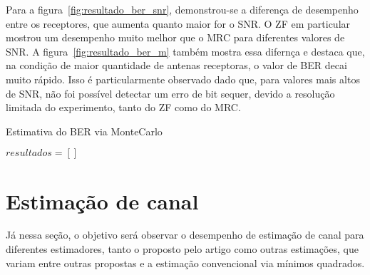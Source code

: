 \documentclass{article}
\begin{document}
Para a figura~\ref{fig:resultado_ber_snr}, demonstrou-se a diferença de desempenho entre os receptores, que aumenta quanto maior for o SNR. O ZF em particular mostrou um desempenho muito melhor que o MRC para diferentes valores de SNR. A figura~\ref{fig:resultado_ber_m} também mostra essa difernça e destaca que, na condição de maior quantidade de antenas receptoras, o valor de BER decai muito rápido. Isso é particularmente observado dado que, para valores mais altos de SNR, não foi possível detectar um erro de bit sequer, devido a resolução limitada do experimento, tanto do ZF como do MRC.

\begin{algorithm}
    \label{alg:ber_snr}
    \caption{Estimativa do BER via MonteCarlo}
    $resultados = []$
\end{algorithm}


\section{Estimação de canal}
\label{sec:estimacao_canal}

Já nessa seção, o objetivo será observar o desempenho de estimação de canal para diferentes estimadores, tanto o proposto pelo artigo como outras estimações, que variam entre outras propostas e a estimação convencional via mínimos quadrados. 
\end{document}
